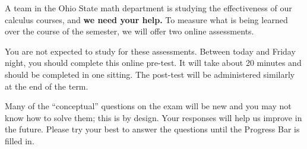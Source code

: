 \documentclass{ximera}
\begin{document}
A team in the Ohio State math department is studying the effectiveness
of our calculus courses, and \textbf{we need your help.}  To measure
what is being learned over the course of the semester, we will offer
two online assessments.

You are not expected to study for these assessments.  Between today
and Friday night, you should complete this online pre-test.  It will
take about 20 minutes and should be completed in one sitting.  The
post-test will be administered similarly at the end of the term.

Many of the ``conceptual'' questions on the exam will be new and you
may not know how to solve them; this is by design.  Your responses
will help us improve in the future.  Please try your best to answer
the questions until the Progress Bar is filled in.
\end{document}
